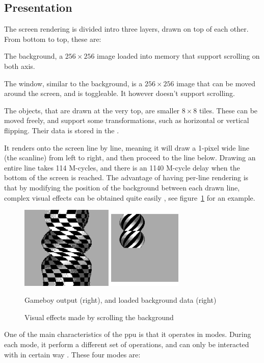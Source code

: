 \documentclass[11pt]{informatics-report}
\begin{document}
\subsection{Presentation}

The screen rendering is divided intro three layers, drawn on top of each other. From bottom to top, these are:

\begin{compactitem}
	\item The background, a $256 \times 256$ image loaded into memory that support scrolling on both axis.
	\item The window, similar to the background, is a $256 \times 256$ image that can be moved around the screen, and is toggleable. It however doesn't support scrolling.
	\item The objects, that are drawn at the very top, are smaller $8 \times 8$ tiles. These can be moved freely, and support some transformations, such as horizontal or vertical flipping. Their data is stored in the .
\end{compactitem}

It renders onto the screen line by line, meaning it will draw a 1-pixel wide line (the scanline) from left to right, and then proceed to the line below. Drawing an entire line takes 114 M-cycles, and there is an 1140 M-cycle delay when the bottom of the screen is reached. The advantage of having per-line rendering is that by modifying the position of the background between each drawn line, complex visual effects can be obtained quite easily \cite{gameboy_talk}, see figure~\ref{fig:background-transform} for an example.

\begin{figure}[h]
    \centering
    \includegraphics[width=8cm]{images/background-transform}\\
    \caption{Visual effects made by scrolling the background}
    Gameboy output (right), and loaded background data (right)
    \label{fig:background-transform}
\end{figure}

One of the main characteristics of the \gls{ppu} is that it operates in modes. During each mode, it perform a different set of operations, and can only be interacted with in certain way \cite[LCD Status Registers]{pandoc}. These four modes are:
\end{document}
